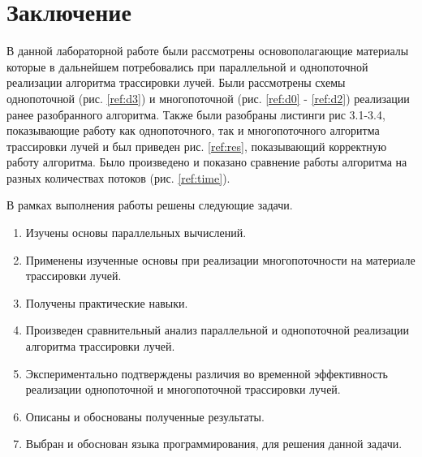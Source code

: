 \chapter*{Заключение}

В данной лабораторной работе были рассмотрены
основополагающие материалы которые в дальнейшем потребовались
при параллельной и однопоточной реализации алгоритма трассировки лучей.
Были рассмотрены схемы однопоточной (рис. \ref{ref:d3}) и многопоточной
(рис. \ref{ref:d0} - \ref{ref:d2}) реализации ранее разобранного алгоритма.
Также были разобраны листинги рис 3.1-3.4, показывающие работу как однопоточного, так и многопоточного
алгоритма трассировки лучей и был приведен рис. \ref{ref:res}, показывающий корректную работу алгоритма.
Было произведено и показано сравнение работы алгоритма на разных количествах потоков (рис. \ref{ref:time}).

В рамках выполнения работы решены следующие задачи.

\begin{enumerate}
	\item Изучены основы параллельных вычислений.
	\item Применены изученные основы при реализации многопоточности на материале трассировки лучей.
	\item Получены практические навыки.
	\item Произведен сравнительный анализ параллельной и однопоточной реализации алгоритма трассировки лучей.
	\item Экспериментально подтверждены различия во временной эффективность реализации однопоточной и многопоточной трассировки лучей.
	\item Описаны и обоснованы полученные результаты.
	\item Выбран и обоснован языка программирования, для решения данной задачи.
\end{enumerate}
